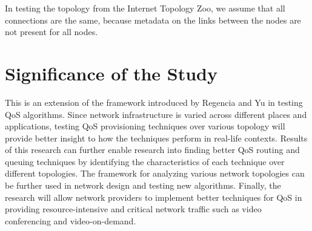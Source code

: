 In testing the topology from the Internet Topology Zoo, we assume that all connections are the same, because metadata on the links between the nodes are not present for all nodes.

\section{Significance of the Study}

This is an extension of the framework introduced by Regencia and Yu in testing QoS algorithms. Since network infrastructure is varied across different places and applications, testing QoS provisioning techniques over various topology will provide better insight to how the techniques perform in real-life contexts. Results of this research can further enable research into finding better QoS routing and queuing techniques by identifying the characteristics of each technique over different topologies. The framework for analyzing various network topologies can be further used in network design and testing new algorithms. Finally, the research will allow network providers to implement better techniques for QoS in providing resource-intensive and critical network traffic such as video conferencing and video-on-demand.

